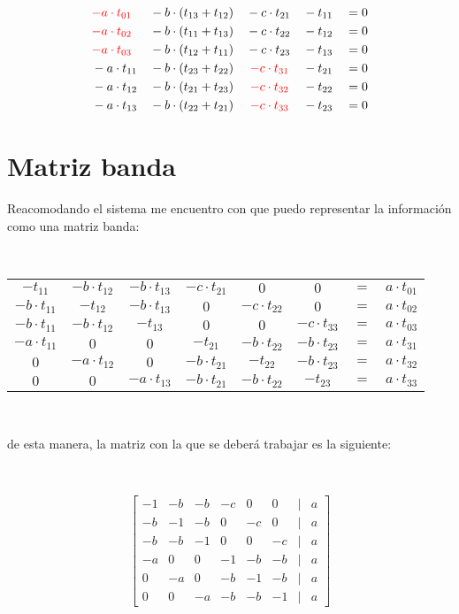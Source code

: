\documentclass{article}
\begin{document}
\begin{align*}
    &\textcolor{red}{-a\cdot t_{01}}& &-b\cdot(t_{13} +t_{12})& &-c\cdot t_{21}& &-t_{11}& &= 0 \\
    &\textcolor{red}{-a\cdot t_{02}}& &-b\cdot(t_{11} +t_{13})& &-c\cdot t_{22}& &-t_{12}& &= 0 \\
    &\textcolor{red}{-a\cdot t_{03}}& &-b\cdot(t_{12} +t_{11})& &-c\cdot t_{23}& &-t_{13}& &= 0 \\
    &-a\cdot t_{11}& &-b\cdot(t_{23} +t_{22})& &~\textcolor{red}{-c\cdot t_{31}}& &-t_{21}& &= 0 \\
    &-a\cdot t_{12}& &-b\cdot(t_{21} +t_{23})& &~\textcolor{red}{-c\cdot t_{32}}& &-t_{22}& &= 0 \\
    &-a\cdot t_{13}& &-b\cdot(t_{22} +t_{21})& &~\textcolor{red}{-c\cdot t_{33}}& &-t_{23}& &= 0 \\
\end{align*}

\section*{Matriz banda}

Reacomodando el sistema me encuentro con que puedo representar la información como una matriz banda:

\

\begin{center}
    \begin{tabular}{c c c c c c c c}
        $-t_{11}$ & $-b\cdot t_{12}$ & $-b\cdot t_{13}$ & $-c\cdot t_{21}$ & $0$ & $0$ & $=$ & $a\cdot t_{01}$ \\
        $-b\cdot t_{11}$ & $-t_{12}$ & $-b\cdot t_{13}$ & $0$ & $-c\cdot t_{22}$ & $0$ & $=$ & $a\cdot t_{02}$ \\
        $-b\cdot t_{11}$ & $-b\cdot t_{12}$ & $-t_{13}$ & $0$ & $0$ & $-c\cdot t_{33}$ & $=$ & $a\cdot t_{03}$ \\
        $-a\cdot t_{11}$ & $0$ & $0$ & $-t_{21}$ & $-b\cdot t_{22}$ & $-b\cdot t_{23}$ & $=$ & $a\cdot t_{31}$ \\
        $0$ & $-a\cdot t_{12}$ & $0$ & $-b\cdot t_{21}$ & $-t_{22}$ & $-b\cdot t_{23}$ & $=$ & $a\cdot t_{32}$ \\
        $0$ & $0$ & $-a\cdot t_{13}$ & $-b\cdot t_{21}$ & $-b\cdot t_{22}$ & $-t_{23}$ & $=$ & $a\cdot t_{33}$
    \end{tabular}
\end{center}

\

de esta manera, la matriz con la que se deberá trabajar es la siguiente:

\

\[
\begin{bmatrix}
    -1 & -b & -b & -c & 0 & 0 & | & a \\
    -b & -1 & -b & 0 & -c & 0 & | & a \\
    -b & -b & -1 & 0 & 0 & -c & | & a \\
    -a & 0 & 0 & -1 & -b & -b & | & a \\
    0 & -a & 0 & -b & -1 & -b & | & a \\
    0 & 0 & -a & -b & -b & -1 & | & a
\end{bmatrix}
\]
\end{document}
